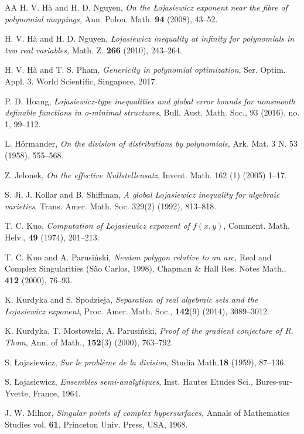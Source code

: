 \documentclass[reqno, 12pt ,a4letter]{amsart}
\theoremstyle{definition}
\begin{document}
\begin{thebibliography}{AA}
H. V. H\` a and H. D. Nguyen, {\em On the \L ojasiewicz exponent near the fibre of polynomial mappings,} Ann. Polon. Math. {\bf 94} (2008), 43--52.

H. V. H\` a and H. D. Nguyen, {\em \L ojasiewicz inequality at infinity for polynomials in two real variables,} Math. Z. {\bf 266} (2010), 243--264.

H. V. H\` a and T. S. Pham, {\em Genericity in polynomial optimization}, Ser. Optim. Appl. 3. World Scientific, Singapore, 2017.

P. D. Hoang, {\em \L ojasiewicz-type inequalities and global error bounds for nonsmooth definable functions in o-minimal structures}, Bull. Aust. Math. Soc., 93 (2016), no. 1, 99–112.

L. H\"ormander, {\em On the division of distributions by polynomials,} Ark. Mat. {3} N. 53 (1958), 555--568.

Z. Jelonek, {\em On the effective Nullstellensatz}, Invent. Math. 162 (1) (2005) 1–17.

S. Ji, J. Kollar and B. Shiffman, {\em A global Lojasiewicz inequality for algebraic varieties}, Trans. Amer. Math. Soc. 329(2) (1992), 813–818.

T. C. Kuo, {\em Computation of {{\L}}ojasiewicz exponent of $f(x, y)$}, Comment. Math. Helv., {\bf 49} (1974), 201--213.

T. C. Kuo and A. Parusi\'nski, {\em Newton polygon relative to an arc,} Real and Complex Singularities (S\~ao Carlos, 1998), Chapman \& Hall Res. Notes Math., {\bf 412} (2000), 76--93.

 K. Kurdyka and S. Spodzieja, {\em Separation of real algebraic sets and the {{\L}}ojasiewicz exponent}, Proc. Amer. Math. Soc., {\bf 142}(9) (2014), 3089--3012.

K. Kurdyka, T. Mostowski, A. Parusiński, {\em Proof of the gradient conjecture of R. Thom}, Ann. of Math., {\bf 152}(3) (2000), 763--792.

S. \L ojasiewicz, {\em Sur le probl\`eme de la division}, Studia Math.{\bf 18} (1959), 87--136.

S. {{\L}}ojasiewicz, {\em Ensembles semi-analytiques}, Inst. Hautes Etudes Sci., Bures-sur-Yvette, France, 1964.

J. W. Milnor, {\em Singular points of complex hypersurfaces,} Annals of Mathematics Studies vol. {\bf 61}, Princeton Univ. Press, USA, 1968.


\end{thebibliography}
\end{document}
